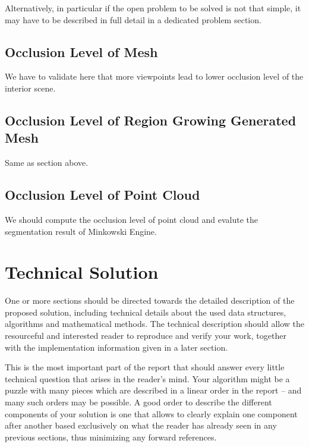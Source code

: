 \documentclass[11pt, a4paper,oneside,chapterprefix=false]{scrbook}
\begin{document}
Alternatively, in particular if the open problem to be solved is not that simple, it may have to be described in full detail in a dedicated problem section.

\section{Occlusion Level of Mesh} \label{sec:occlusion}

We have to validate here that more viewpoints lead to lower occlusion level of the interior scene.

\section{Occlusion Level of Region Growing Generated Mesh} \label{sec:occlusion}

Same as section above.

\section{Occlusion Level of Point Cloud} \label{sec:occlusion}

We should compute the occlusion level of point cloud and evalute the segmentation result of Minkowski Engine.



\chapter{Technical Solution} \label{chp:solution}

One or more sections should be directed towards the detailed description of the proposed solution, including technical details about the used data structures, algorithms and mathematical methods. The technical description should allow the resourceful and interested reader to reproduce and verify your work, together with the implementation information given in a later section.

This is the most important part of the report that should answer every little technical question that arises in the reader's mind. Your algorithm might be a puzzle with many pieces which are described in a linear order in the report -- and many such orders may be possible. A good order to describe the different components of your solution is one that allows to clearly explain one component after another based exclusively on what the reader has already seen in any previous sections, thus minimizing any forward references.
\end{document}
